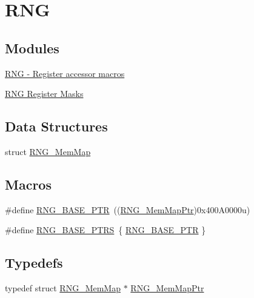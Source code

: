 \hypertarget{group___r_n_g___peripheral}{}\section{R\+N\+G}
\label{group___r_n_g___peripheral}
\subsection*{Modules}
\begin{DoxyCompactItemize}
\item 
\hyperlink{group___r_n_g___register___accessor___macros}{R\+N\+G -\/ Register accessor macros}
\item 
\hyperlink{group___r_n_g___register___masks}{R\+N\+G Register Masks}
\end{DoxyCompactItemize}
\subsection*{Data Structures}
\begin{DoxyCompactItemize}
\item 
struct \hyperlink{struct_r_n_g___mem_map}{R\+N\+G\+\_\+\+Mem\+Map}
\end{DoxyCompactItemize}
\subsection*{Macros}
\begin{DoxyCompactItemize}
\item 
\#define \hyperlink{group___r_n_g___peripheral_ga799f35e89514a95969257046b5dab042}{R\+N\+G\+\_\+\+B\+A\+S\+E\+\_\+\+P\+T\+R}~((\hyperlink{group___r_n_g___peripheral_gacbf25de72830d12c2d542ff109e3b1df}{R\+N\+G\+\_\+\+Mem\+Map\+Ptr})0x400\+A0000u)
\item 
\#define \hyperlink{group___r_n_g___peripheral_gafe29fd84164c78d03c9a7a2128caf361}{R\+N\+G\+\_\+\+B\+A\+S\+E\+\_\+\+P\+T\+R\+S}~\{ \hyperlink{group___r_n_g___peripheral_ga799f35e89514a95969257046b5dab042}{R\+N\+G\+\_\+\+B\+A\+S\+E\+\_\+\+P\+T\+R} \}
\end{DoxyCompactItemize}
\subsection*{Typedefs}
\begin{DoxyCompactItemize}
\item 
typedef struct \hyperlink{struct_r_n_g___mem_map}{R\+N\+G\+\_\+\+Mem\+Map} $\ast$ \hyperlink{group___r_n_g___peripheral_gacbf25de72830d12c2d542ff109e3b1df}{R\+N\+G\+\_\+\+Mem\+Map\+Ptr}
\end{DoxyCompactItemize}


